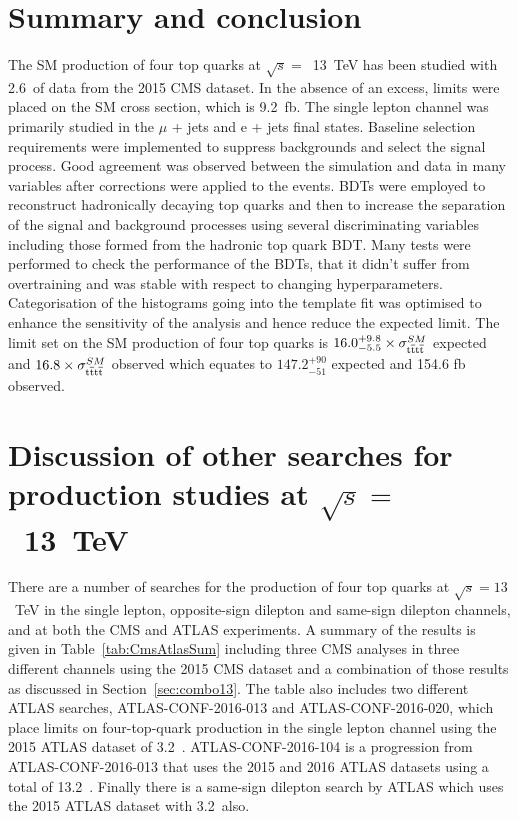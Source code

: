 \section{Summary and conclusion}
\label{sec:summary13}

The SM production of four top quarks at $\sqrt{s} =$~13~TeV has been studied with 2.6~\fbinv of data from the 2015 CMS dataset. In the absence of an excess, limits were placed on the SM cross section, which is 9.2~fb. The single lepton channel was primarily studied in the $\mu$ + jets and e + jets final states. Baseline selection requirements were implemented to suppress backgrounds and select the signal \tttt process. Good agreement was observed between the simulation and data in many variables after corrections were applied to the events. BDTs were employed to reconstruct hadronically decaying top quarks and then to increase the separation of the signal and background processes using several discriminating variables including those formed from the hadronic top quark BDT. Many tests were performed to check the performance of the BDTs, that it didn't suffer from overtraining and was stable with respect to changing hyperparameters. Categorisation of the histograms going into the template fit was optimised to enhance the sensitivity of the analysis and hence reduce the expected limit. The limit set on the SM production of four top quarks is $16.0^{+9.8}_{-5.5}\times \sigma_{{\mathrm{t}\overline{\mathrm{t}}\mathrm{t}\overline{\mathrm{t}}}}^{SM} $ expected and $16.8\times \sigma_{{\mathrm{t}\overline{\mathrm{t}}\mathrm{t}\overline{\mathrm{t}}}}^{SM} $ observed which equates to $147.2^{+90}_{-51}$ expected and 154.6 fb observed.

\section{Discussion of other searches for \tttt production studies at $\sqrt{s} =$~13~TeV}
\label{sec:ATLASresult13}

There are a number of searches for the production of four top quarks at $\sqrt{s}=13$~TeV in the single lepton, opposite-sign dilepton and same-sign dilepton channels, and at both the CMS and ATLAS experiments. A summary of the results is given in Table~\ref{tab:CmsAtlasSum} including three CMS analyses in three different channels using the 2015 CMS dataset and a combination of those results as discussed in Section~\ref{sec:combo13}. The table also includes two different ATLAS searches, ATLAS-CONF-2016-013 and ATLAS-CONF-2016-020, which place limits on four-top-quark production in the single lepton channel using the 2015 ATLAS dataset of 3.2~\fbinv. ATLAS-CONF-2016-104 is a progression from ATLAS-CONF-2016-013 that uses the 2015 and 2016 ATLAS datasets using a total of 13.2~\fbinv. Finally there is a same-sign dilepton search by ATLAS which uses the 2015 ATLAS dataset with 3.2~\fbinv also.

